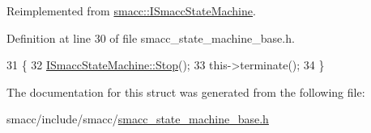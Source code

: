 Reimplemented from \hyperlink{classsmacc_1_1ISmaccStateMachine_a45032346275dcc8e23abece4d524ca3c}{smacc\+::\+I\+Smacc\+State\+Machine}.



Definition at line 30 of file smacc\+\_\+state\+\_\+machine\+\_\+base.\+h.


\begin{DoxyCode}
31     \{
32         \hyperlink{classsmacc_1_1ISmaccStateMachine_a45032346275dcc8e23abece4d524ca3c}{ISmaccStateMachine::Stop}();
33         this->terminate();
34     \}
\end{DoxyCode}


The documentation for this struct was generated from the following file\+:\begin{DoxyCompactItemize}
\item 
smacc/include/smacc/\hyperlink{smacc__state__machine__base_8h}{smacc\+\_\+state\+\_\+machine\+\_\+base.\+h}\end{DoxyCompactItemize}
